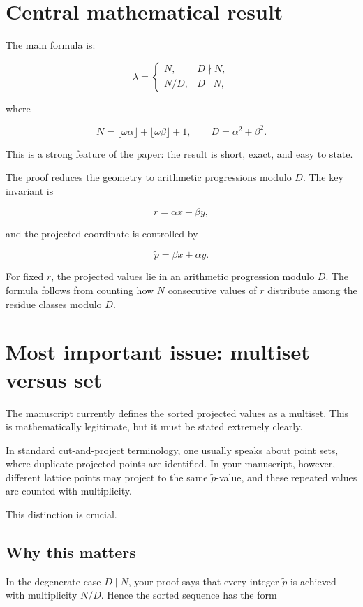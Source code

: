 \documentclass[11pt]{article}
\begin{document}
\section*{Central mathematical result}

The main formula is:

\[
\lambda =
\begin{cases}
N, & D \nmid N,\\
N/D, & D \mid N,
\end{cases}
\]

where

\[
N = \lfloor \omega\alpha \rfloor
  + \lfloor \omega\beta \rfloor + 1,
\qquad
D = \alpha^2+\beta^2.
\]

This is a strong feature of the paper: the result is short, exact, and easy
to state.

The proof reduces the geometry to arithmetic progressions modulo \(D\).
The key invariant is

\[
r = \alpha x - \beta y,
\]

and the projected coordinate is controlled by

\[
\tilde p = \beta x + \alpha y.
\]

For fixed \(r\), the projected values lie in an arithmetic progression modulo
\(D\).  The formula follows from counting how \(N\) consecutive values of
\(r\) distribute among the residue classes modulo \(D\).

\section*{Most important issue: multiset versus set}

The manuscript currently defines the sorted projected values as a multiset.
This is mathematically legitimate, but it must be stated extremely clearly.

In standard cut-and-project terminology, one usually speaks about point sets,
where duplicate projected points are identified.  In your manuscript,
however, different lattice points may project to the same \(\tilde p\)-value,
and these repeated values are counted with multiplicity.

This distinction is crucial.

\subsection*{Why this matters}

In the degenerate case \(D \mid N\), your proof says that every integer
\(\tilde p\) is achieved with multiplicity \(N/D\).  Hence the sorted sequence
has the form
\end{document}
